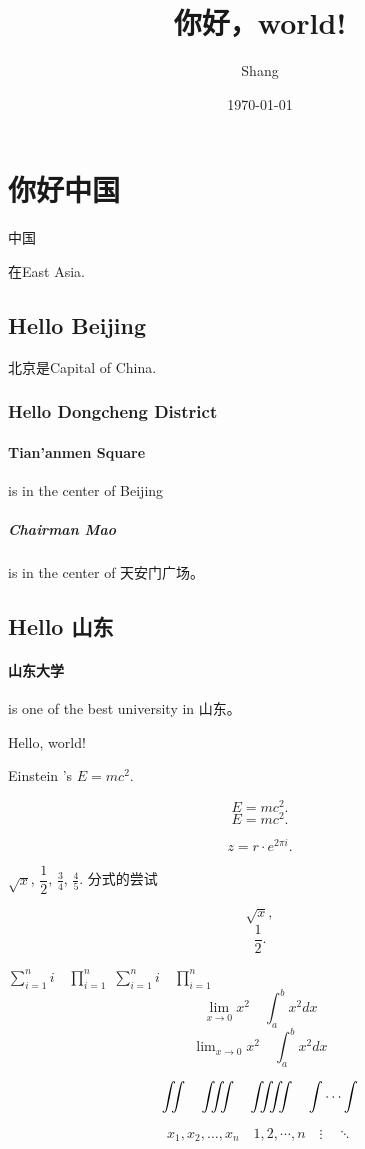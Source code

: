 \documentclass[UTF8]{ctexart}
\title{你好，world!}
\author{Shang}
\date{\today}
\begin{document}
\maketitle
\tableofcontents
\section{你好中国}
中国

在East Asia.
\subsection{Hello Beijing}
北京是Capital of China.
\subsubsection{Hello Dongcheng District}
\paragraph{Tian'anmen Square}
is in the center of Beijing
\subparagraph{Chairman Mao}
is in the center of 天安门广场。
\subsection{Hello 山东}
\paragraph{山东大学} is one of the best university in 山东。

Hello, world!

Einstein 's $E=mc^2$.

\[ E=mc^ 2. \]
\begin{equation}
    E=mc^2.
\end{equation}

\begin{equation}
    z=r\cdot e^{2\pi i}.
\end{equation}

$\sqrt{x}$, $\dfrac{1}{2}$, $\tfrac{3}{4}$, $\frac{4}{5}$. 分式的尝试

\[ \sqrt{x}, \]
\[ \frac{1}{2}. \]

$ \sum_{i=1}^n i\quad \prod_{i=1}^n $
$ \sum\limits _{i=1}^n i\quad \prod\limits _{i=1}^n $
\[ \lim_{x\to0}x^2 \quad \int_a^b x^2 dx \]
\[ \lim\nolimits _{x\to0}x^2\quad \int\nolimits_a^b x^2 dx \]

\[ \iint\quad \iiint\quad \iiiint\quad \idotsint \]

\[ x_1,x_2,\dots ,x_n\quad 1,2,\cdots ,n\quad
\vdots\quad \ddots \]
\end{document}
